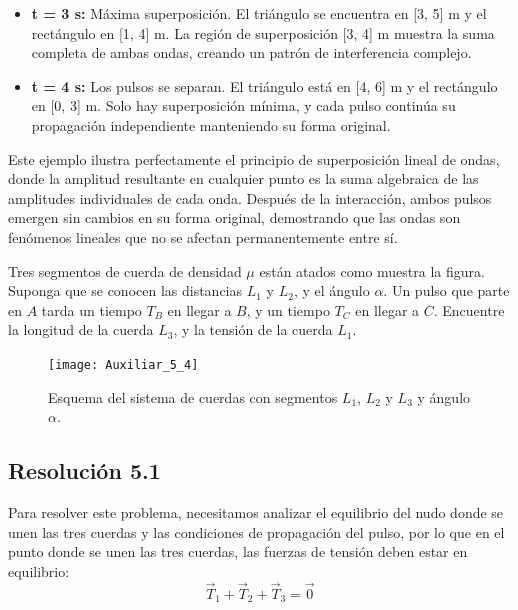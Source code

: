 \documentclass[
  11pt,
  letterpaper,
   addpoints,
   answers
  ]{exam}
\begin{document}
\begin{questions}
\begin{solution}
\begin{itemize}
\item \textbf{t = 3 s:} Máxima superposición. El triángulo se encuentra en [3, 5] m y el rectángulo en [1, 4] m. La región de superposición [3, 4] m muestra la suma completa de ambas ondas, creando un patrón de interferencia complejo.

\item \textbf{t = 4 s:} Los pulsos se separan. El triángulo está en [4, 6] m y el rectángulo en [0, 3] m. Solo hay superposición mínima, y cada pulso continúa su propagación independiente manteniendo su forma original.
\end{itemize}

Este ejemplo ilustra perfectamente el principio de superposición lineal de ondas, donde la amplitud resultante en cualquier punto es la suma algebraica de las amplitudes individuales de cada onda. Después de la interacción, ambos pulsos emergen sin cambios en su forma original, demostrando que las ondas son fenómenos lineales que no se afectan permanentemente entre sí.
\end{solution}
\question  Tres segmentos de cuerda de densidad $\mu$ están atados como muestra la figura. 
Suponga que se conocen las distancias $L_1$ y $L_2$, y el ángulo $\alpha$. 
Un pulso que parte en $A$ tarda un tiempo $T_B$ en llegar a $B$, y un tiempo $T_C$ en llegar a $C$. Encuentre la longitud de la cuerda $L_3$, y la tensión de la cuerda $L_1$.

\begin{figure}[h]
    \centering
    \texttt{[image: Auxiliar\_5\_4]}
    \caption{Esquema del sistema de cuerdas con segmentos $L_1$, $L_2$ y $L_3$ y ángulo $\alpha$.}
    \label{fig:cuerdas}
\end{figure}

\begin{solution}

\subsection*{Resolución 5.1}

Para resolver este problema, necesitamos analizar el equilibrio del nudo donde se unen las tres cuerdas y las condiciones de propagación del pulso, por lo que en el punto donde se unen las tres cuerdas, las fuerzas de tensión deben estar en equilibrio:
\begin{equation}
\vec{T}_1 + \vec{T}_2 + \vec{T}_3 = \vec{0}
\end{equation}


\end{solution}
\end{questions}
\end{document}
